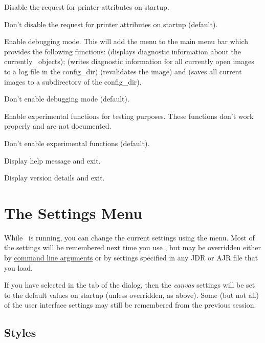 Disable the request for printer attributes on startup.

Don't disable the request for printer attributes on startup (default).

Enable debugging mode. This will add the 
menu to the main menu bar which provides the following functions:
 (displays diagnostic information about the
currently \selected\ objects);  (writes
diagnostic information for all currently open images to a log file
in the \gls{config_dir})  (revalidates the
image) and  (saves all current images to a
subdirectory of the \gls{config_dir}).

Don't enable debugging mode (default).

Enable experimental functions for testing purposes. These functions don't
work properly and are not documented.

Don't enable experimental functions (default).

Display help message and exit.

Display version details and exit.

\section{The Settings Menu}\label{sec:settingsmenu}


While \FlowframTk\ is running, you can change the current settings
using the  menu. Most of the settings will be
remembered next time you use \FlowframTk, but may be overridden
either by \hyperref[sec:cmdargs]{command line arguments} or by
settings specified in any \gls{JDR} or \gls{AJR} file that you load.

If you have selected  in the
 tab of the  dialog,
then the \emph{\gls{canvas}} settings will be set to the default
values on startup (unless overridden, as above). Some (but not all)
of the user interface settings may still be remembered from the
previous session.

\subsection{Styles}\label{sec:setcurrentstyles}

